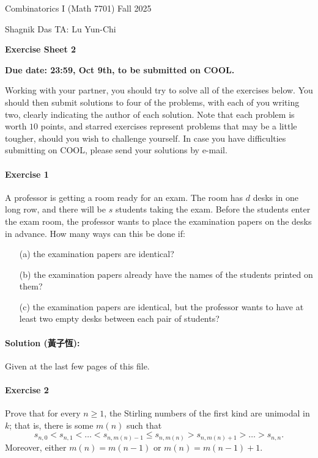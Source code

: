 \documentclass[a4paper,12pt]{article}
\newcommand{\courseTitle}{Combinatorics I (Math 7701)}
\newcommand{\semester}{Fall 2025}
\newcommand{\instructorA}{Shagnik Das}
\newcommand{\instructorB}{TA: Lu Yun-Chi}
\newcommand{\sheetNumber}{2}
\newcommand{\dueDate}{23:59, Oct 9th, to be submitted on COOL.}
\newcommand{\buildtitle}[4]{
\begin{flushleft}
{\large
#1
\hfill{}
#2
\par
#3
}
\end{flushleft}
\vskip 4pt
\begin{center}
{\large\bfseries#4\par}
\end{center}
\bigskip
}
\begin{document}
\buildtitle{\courseTitle{}}{\semester}{\instructorA{} \hfill \instructorB{}}{Exercise Sheet \sheetNumber{}}

\vspace{-0.2in}

\begin{center}

{\bf Due date: \dueDate{}}

\end{center}

\noindent Working with your partner, you should try to solve all of the exercises below. You should then submit solutions to four of the problems, with each of you writing two, clearly indicating the author of each solution. Note that each problem is worth $10$ points, and starred exercises represent problems that may be a little tougher, should you wish to challenge yourself. In case you have difficulties submitting on COOL, please send your solutions by e-mail.

\paragraph{Exercise 1}  A professor is getting a room ready for an exam.  The room has $d$ desks in one long row, and there will be $s$ students taking the exam.  Before the students enter the exam room, the professor wants to place the examination papers on the desks in advance.  How many ways can this be done if:
\begin{itemize}
	\item[(a)] the examination papers are identical?
	\item[(b)] the examination papers already have the names of the students printed on them?
	\item[(c)] the examination papers are identical, but the professor wants to have at least two empty desks between each pair of students?
\end{itemize}
\vspace{-1em}
\paragraph{Solution (黃子恆):} Given at the last few pages of this file.

\paragraph{Exercise 2}  Prove that for every $n \ge 1$, the Stirling numbers of the first kind are unimodal in $k$; that is, there is some $m(n)$ such that
\[ s_{n,0} < s_{n,1} < \hdots < s_{n,m(n)-1} \le s_{n,m(n)} > s_{n,m(n)+ 1} > \hdots > s_{n,n}. \]
Moreover, either $m(n) = m(n-1)$ or $m(n) = m(n-1) + 1$.
\end{document}
